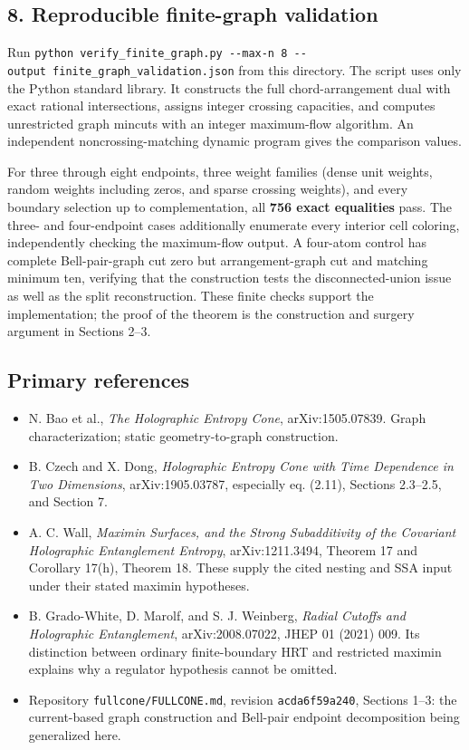 \documentclass[11pt]{article}
\providecommand{\tightlist}{\setlength{\itemsep}{1pt}\setlength{\parskip}{0pt}}
\begin{document}
\subsection{8. Reproducible finite-graph
validation}\label{reproducible-finite-graph-validation}

Run
\texttt{python\ verify\_\allowbreak finite\_\allowbreak graph.py\ -\/-max-n\ 8\ -\/-output\ finite\_\allowbreak graph\_\allowbreak validation.json}
from this directory. The script uses only the Python standard library.
It constructs the full chord-arrangement dual with exact rational
intersections, assigns integer crossing capacities, and computes
unrestricted graph mincuts with an integer maximum-flow algorithm. An
independent noncrossing-matching dynamic program gives the comparison
values.

For three through eight endpoints, three weight families (dense unit
weights, random weights including zeros, and sparse crossing weights),
and every boundary selection up to complementation, all \textbf{756
exact equalities} pass. The three- and four-endpoint cases additionally
enumerate every interior cell coloring, independently checking the
maximum-flow output. A four-atom control has complete Bell-pair-graph
cut zero but arrangement-graph cut and matching minimum ten, verifying
that the construction tests the disconnected-union issue as well as the
split reconstruction. These finite checks support the implementation;
the proof of the theorem is the construction and surgery argument in
Sections 2--3.

\subsection{Primary references}\label{primary-references-3}

\begin{itemize}
\tightlist
\item
  N. Bao et al., \emph{The Holographic Entropy Cone}, arXiv:1505.07839.
  Graph characterization; static geometry-to-graph construction.
\item
  B. Czech and X. Dong, \emph{Holographic Entropy Cone with Time
  Dependence in Two Dimensions}, arXiv:1905.03787, especially eq.
  (2.11), Sections 2.3--2.5, and Section 7.
\item
  A. C. Wall, \emph{Maximin Surfaces, and the Strong Subadditivity of
  the Covariant Holographic Entanglement Entropy}, arXiv:1211.3494,
  Theorem 17 and Corollary 17(h), Theorem 18. These supply the cited
  nesting and SSA input under their stated maximin hypotheses.
\item
  B. Grado-White, D. Marolf, and S. J. Weinberg, \emph{Radial Cutoffs
  and Holographic Entanglement}, arXiv:2008.07022, JHEP 01 (2021) 009.
  Its distinction between ordinary finite-boundary HRT and restricted
  maximin explains why a regulator hypothesis cannot be omitted.
\item
  Repository \texttt{fullcone/FULLCONE.md}, revision
  \texttt{acda6f59a240}, Sections 1--3: the current-based graph
  construction and Bell-pair endpoint decomposition being generalized
  here.
\end{itemize}
\end{document}
